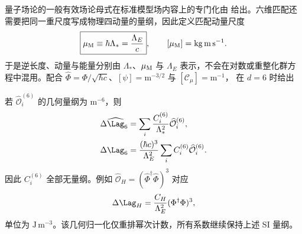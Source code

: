 量子场论的一般有效场论母式在标准模型场内容上的专门化由 给出。六维匹配还需要把同一重尺度写成物理四动量的量纲，因此定义匹配动量尺度
\begin{equation}
\boxed{\mu_{\rm M}\equiv\hbar\Lambda_*=\frac{\Lambda_E}{c}},
\qquad [\mu_{\rm M}]=\mathrm{kg\,m\,s^{-1}}.
\label{eq:smeft-matching-momentum-dp13}
\end{equation}
于是逆长度、动量与能量分别由 $\Lambda_*$、$\mu_{\rm M}$ 与 $\Lambda_E$ 表示，不会在对数或重整化群方程中混用。配合 $\widehat\Phi=\Phi/\sqrt{\hbar c}$、$[\psi]=\mathrm{m^{-3/2}}$ 与 $[\mathscr C_\mu]=\mathrm{m^{-1}}$， 在 $d=6$ 时给出

若 $\widehat{\mathcal O}_i^{(6)}$ 的几何量纲为 $\mathrm{m^{-6}}$，则
\begin{align}
\Delta\widehat\Lag_6
&=\sum_i\frac{C_i^{(6)}}{\Lambda_*^2}\widehat{\mathcal O}_i^{(6)},
\label{eq:smeft-geometric-normalization-dp13}\\
\Delta\Lag_6
&=\frac{(\hbar c)^3}{\Lambda_E^2}
\sum_iC_i^{(6)}\widehat{\mathcal O}_i^{(6)}.
\label{eq:smeft-si-normalization-dp13}
\end{align}
因此 $C_i^{(6)}$ 全部无量纲。例如 $\widehat{\mathcal O}_H=(\widehat\Phi^\dagger\widehat\Phi)^3$ 对应
\begin{equation*}
\Delta\Lag_H=\frac{C_H}{\Lambda_E^2}(\Phi^\dagger\Phi)^3,
\end{equation*}
单位为 $\mathrm{J\,m^{-3}}$。该几何归一化仅重排幂次计数，所有系数继续保持上述 SI 量纲。


